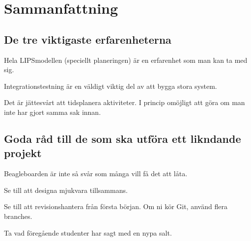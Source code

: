 
\section{Sammanfattning}

\subsection{De tre viktigaste erfarenheterna}

Hela LIPSmodellen (speciellt planeringen) är en erfarenhet som man kan ta med sig.
\newline

Integrationstestning är en väldigt viktig del av att bygga stora system.
\newline

Det är jättesvårt att tidsplanera aktiviteter. I princip omöjligt att göra om man inte har gjort samma sak innan.

\subsection{Goda råd till de som ska utföra ett likndande projekt}

Beagleboarden är inte så svår som många vill få det att låta.
\newline

Se till att designa mjukvara tillsammans.
\newline

Se till att revisionshantera från första början. Om ni kör Git, använd flera branches.
\newline

Ta vad föregående studenter har sagt med en nypa salt.
